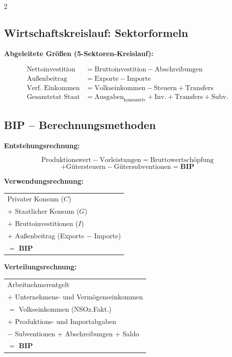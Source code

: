 \documentclass[10pt,a4paper]{article}
\begin{document}
\begin{multicols}{2}
\columnbreak

\subsection{Wirtschaftskreislauf: Sektorformeln}

\textbf{Abgeleitete Größen (5-Sektoren-Kreislauf):}
\begin{vwlbox}
\renewcommand{\arraystretch}{1.15}
\begin{align*}
\text{Nettoinvestition} &= \text{Bruttoinvestition} - \text{Abschreibungen}\\
\text{Außenbeitrag} &= \text{Exporte} - \text{Importe}\\
\text{Verf. Einkommen} &= \text{Volkseinkommen} - \text{Steuern} + \text{Transfers}\\
\text{Gesamtetat Staat} &= \text{Ausgaben}_{\text{konsumtiv}} + \text{Inv.} + \text{Transfers} + \text{Subv.}
\end{align*}
\end{vwlbox}

\subsection{BIP -- Berechnungsmethoden}

\textbf{Entstehungsrechnung:}
\begin{vwlbox}
\[
\text{Produktionswert} - \text{Vorleistungen} = \text{Bruttowertschöpfung}
\]
\[
+ \text{Gütersteuern} - \text{Gütersubventionen} = \mathbf{BIP}
\]
\end{vwlbox}

\textbf{Verwendungsrechnung:}
\begin{vwlbox}
\renewcommand{\arraystretch}{1.1}
\begin{tabular}{@{}l@{}}
Privater Konsum ($C$) \\
$+$ Staatlicher Konsum ($G$) \\
$+$ Bruttoinvestitionen ($I$) \\
$+$ Außenbeitrag (Exporte $-$ Importe) \\
\hline
$=$ \textbf{BIP} \\
\end{tabular}
\end{vwlbox}

\textbf{Verteilungsrechnung:}
\begin{vwlbox}
\renewcommand{\arraystretch}{1.1}
\begin{tabular}{@{}l@{}}
Arbeitnehmerentgelt \\
$+$ Unternehmens- und Vermögenseinkommen \\
\hline
$=$ Volkseinkommen (NSOz.Fakt.) \\
$+$ Produktions- und Importabgaben \\
$-$ Subventionen + Abschreibungen + Saldo \\
\hline
$=$ \textbf{BIP} \\
\end{tabular}
\end{vwlbox}


\end{multicols}
\end{document}
